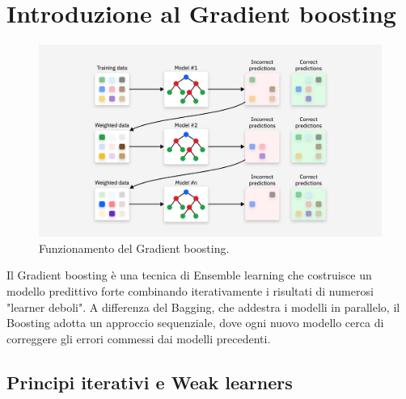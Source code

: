 \documentclass[a4paper,12pt]{report}
\begin{document}
	\section{Introduzione al Gradient boosting}
	\begin{figure}[H]
		\centering
		\includegraphics[width=1.0\textwidth]{img/grad_boost.png}
		\caption{Funzionamento del Gradient boosting.}
	\end{figure}
	
	Il Gradient boosting è una tecnica di Ensemble learning che costruisce un modello predittivo forte combinando iterativamente i risultati di numerosi "learner deboli". A differenza del Bagging, che addestra i modelli in parallelo, il Boosting adotta un approccio sequenziale, dove ogni nuovo modello cerca di correggere gli errori commessi dai modelli precedenti.
	
	\subsection{Principi iterativi e Weak learners}
	
\end{document}
